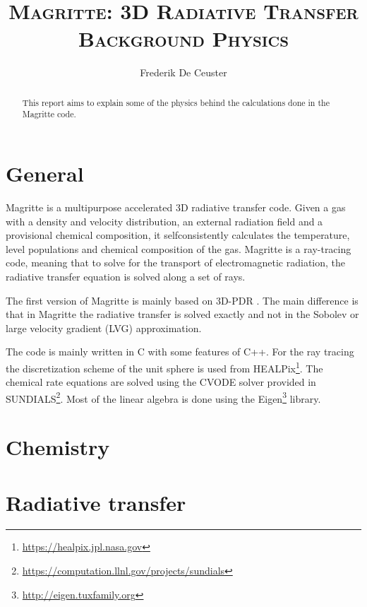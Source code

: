 \documentclass[]{article}
\title{\vspace{0cm} \huge \textsc{Magritte: 3D Radiative Transfer} \\
                \vskip3mm \textsc{ Background Physics} }
\author{\large Frederik De Ceuster}
\date{}
\begin{document}
\maketitle

\vskip5cm

\begin{abstract}
This report aims to explain some of the physics behind the calculations done in the Magritte code.
\end{abstract}

\vskip5cm

\tableofcontents

\newpage


\section{General}

Magritte is a multipurpose accelerated 3D radiative transfer code. Given a gas with a density and velocity distribution, an external radiation field and a provisional chemical composition, it selfconsistently calculates the temperature, level populations and chemical composition of the gas. Magritte is a ray-tracing code, meaning that to solve for the transport of electromagnetic radiation, the radiative transfer equation is solved along a set of rays.

\bigskip

The first version of Magritte is mainly based on 3D-PDR \cite{3DPDR}. The main difference is that in Magritte the radiative transfer is solved exactly and not in the Sobolev or large velocity gradient (LVG) approximation.

\bigskip

The code is mainly written in C with some features of C++. For the ray tracing the discretization scheme of the unit sphere is used from HEALPix\footnote{\url{https://healpix.jpl.nasa.gov}}. The chemical rate equations are solved using the CVODE solver provided in SUNDIALS\footnote{\url{https://computation.llnl.gov/projects/sundials}}. Most of the linear algebra is done using the Eigen\footnote{\url{http://eigen.tuxfamily.org}} library.



\section{Chemistry}


\section{Radiative transfer}
\end{document}
